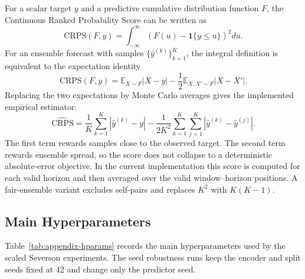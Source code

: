 \documentclass[conference]{IEEEtran}
\begin{document}
For a scalar target $y$ and a predictive cumulative distribution function
$F$, the Continuous Ranked Probability Score can be written as
\begin{equation}
\mathrm{CRPS}(F,y)
=
\int_{-\infty}^{\infty}
\left(F(u)-\mathbf{1}\{y\le u\}\right)^2du .
\end{equation}
For an ensemble forecast with samples $\{\hat y^{(k)}\}_{k=1}^{K}$, the
integral definition is equivalent to the expectation identity
\begin{equation}
\mathrm{CRPS}(F,y)
=
\mathbb{E}_{X\sim F}|X-y|
-
\frac{1}{2}\mathbb{E}_{X,X'\sim F}|X-X'|.
\end{equation}
Replacing the two expectations by Monte Carlo averages gives the implemented
empirical estimator:
\begin{equation*}
\widehat{\mathrm{CRPS}}
=
\frac{1}{K}\sum_{k=1}^{K}|\hat y^{(k)}-y|
-
\frac{1}{2K^2}\sum_{k=1}^{K}\sum_{j=1}^{K}
|\hat y^{(k)}-\hat y^{(j)}|.
\end{equation*}
The first term rewards samples close to the observed target. The second term
rewards ensemble spread, so the score does not collapse to a deterministic
absolute-error objective. In the current implementation this score is computed
for each valid horizon and then averaged over the valid window--horizon
positions. A fair-ensemble variant excludes self-pairs and replaces $K^2$
with $K(K-1)$.

\subsection{Main Hyperparameters}

Table~\ref{tab:appendix-hparams} records the main hyperparameters used by the
scaled Severson experiments. The seed robustness runs keep the encoder and
split seeds fixed at 42 and change only the predictor seed.
\end{document}
